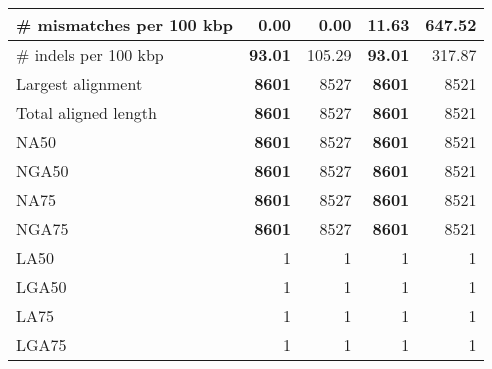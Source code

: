 \documentclass[12pt,a4paper]{article}
\begin{document}
\begin{table}[ht]
\begin{center}
\begin{tabular}{|l*{4}{|r}|}
\# mismatches per 100 kbp & {\bf 0.00} & {\bf 0.00} & 11.63 & 647.52 \\ \hline
\# indels per 100 kbp & {\bf 93.01} & 105.29 & {\bf 93.01} & 317.87 \\ \hline
Largest alignment & {\bf 8601} & 8527 & {\bf 8601} & 8521 \\ \hline
Total aligned length & {\bf 8601} & 8527 & {\bf 8601} & 8521 \\ \hline
NA50 & {\bf 8601} & 8527 & {\bf 8601} & 8521 \\ \hline
NGA50 & {\bf 8601} & 8527 & {\bf 8601} & 8521 \\ \hline
NA75 & {\bf 8601} & 8527 & {\bf 8601} & 8521 \\ \hline
NGA75 & {\bf 8601} & 8527 & {\bf 8601} & 8521 \\ \hline
LA50 & 1 & 1 & 1 & 1 \\ \hline
LGA50 & 1 & 1 & 1 & 1 \\ \hline
LA75 & 1 & 1 & 1 & 1 \\ \hline
LGA75 & 1 & 1 & 1 & 1 \\ \hline
\end{tabular}
\end{center}
\end{table}
\end{document}

